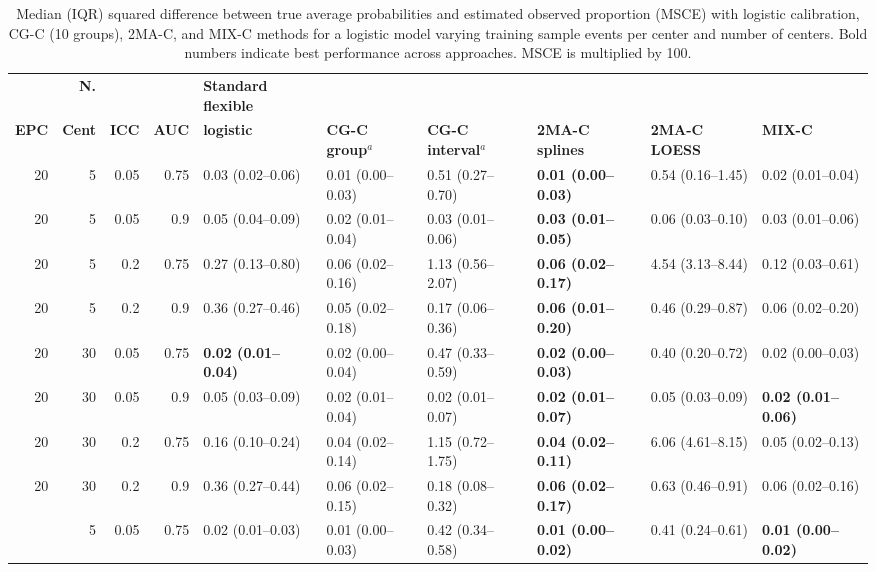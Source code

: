 \begin{table}
\centering
\footnotesize
\setlength{\tabcolsep}{4pt}
\caption[Median MSCE for varying training sample size]{Median (IQR) squared difference between true average probabilities and estimated observed proportion (MSCE) with logistic calibration, CG-C (10 groups), 2MA-C, and MIX-C methods for a logistic model varying training sample events per center and number of centers. Bold numbers indicate best performance across approaches. MSCE is multiplied by 100.}
\label{tab:4:3}
\begin{tabular}{rrrr llllll}
\toprule
 & \textbf{N.} & & & \textbf{Standard flexible} & & & & & \\
\textbf{EPC} & \textbf{Cent} & \textbf{ICC} & \textbf{AUC} & \textbf{logistic} & \textbf{CG-C group}$^a$ & \textbf{CG-C interval}$^a$ & \textbf{2MA-C splines} & \textbf{2MA-C LOESS} & \textbf{MIX-C} \\
\midrule
20 & 5 & 0.05 & 0.75 & 0.03 (0.02--0.06) & 0.01 (0.00--0.03) & 0.51 (0.27--0.70) & \textbf{0.01 (0.00--0.03)} & 0.54 (0.16--1.45) & 0.02 (0.01--0.04) \\
20 & 5 & 0.05 & 0.9 & 0.05 (0.04--0.09) & 0.02 (0.01--0.04) & 0.03 (0.01--0.06) & \textbf{0.03 (0.01--0.05)} & 0.06 (0.03--0.10) & 0.03 (0.01--0.06) \\
20 & 5 & 0.2 & 0.75 & 0.27 (0.13--0.80) & 0.06 (0.02--0.16) & 1.13 (0.56--2.07) & \textbf{0.06 (0.02--0.17)} & 4.54 (3.13--8.44) & 0.12 (0.03--0.61) \\
20 & 5 & 0.2 & 0.9 & 0.36 (0.27--0.46) & 0.05 (0.02--0.18) & 0.17 (0.06--0.36) & \textbf{0.06 (0.01--0.20)} & 0.46 (0.29--0.87) & 0.06 (0.02--0.20) \\
20 & 30 & 0.05 & 0.75 & \textbf{0.02 (0.01--0.04)} & 0.02 (0.00--0.04) & 0.47 (0.33--0.59) & \textbf{0.02 (0.00--0.03)} & 0.40 (0.20--0.72) & 0.02 (0.00--0.03) \\
20 & 30 & 0.05 & 0.9 & 0.05 (0.03--0.09) & 0.02 (0.01--0.04) & 0.02 (0.01--0.07) & \textbf{0.02 (0.01--0.07)} & 0.05 (0.03--0.09) & \textbf{0.02 (0.01--0.06)} \\
20 & 30 & 0.2 & 0.75 & 0.16 (0.10--0.24) & 0.04 (0.02--0.14) & 1.15 (0.72--1.75) & \textbf{0.04 (0.02--0.11)} & 6.06 (4.61--8.15) & 0.05 (0.02--0.13) \\
20 & 30 & 0.2 & 0.9 & 0.36 (0.27--0.44) & 0.06 (0.02--0.15) & 0.18 (0.08--0.32) & \textbf{0.06 (0.02--0.17)} & 0.63 (0.46--0.91) & 0.06 (0.02--0.16) \\
\addlinespace
200 & 5 & 0.05 & 0.75 & 0.02 (0.01--0.03) & 0.01 (0.00--0.03) & 0.42 (0.34--0.58) & \textbf{0.01 (0.00--0.02)} & 0.41 (0.24--0.61) & \textbf{0.01 (0.00--0.02)} \\

\end{tabular}
\end{table}
